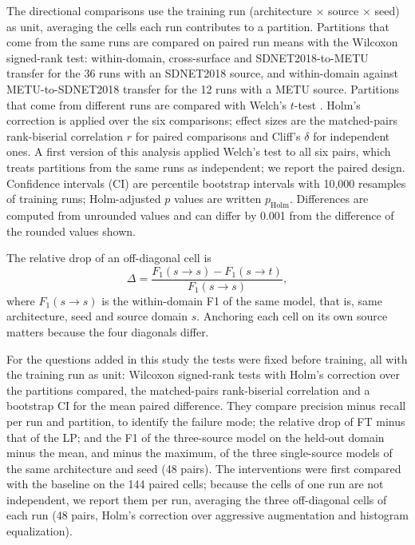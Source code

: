 \documentclass[pdflatex,sn-apa]{sn-jnl}
\begin{document}
The directional comparisons use the training run (architecture $\times$ source $\times$ seed) as unit, averaging the cells each run contributes to a partition. Partitions that come from the same runs are compared on paired run means with the Wilcoxon signed-rank test: within-domain, cross-surface and SDNET2018-to-METU transfer for the 36 runs with an SDNET2018 source, and within-domain against METU-to-SDNET2018 transfer for the 12 runs with a METU source. Partitions that come from different runs are compared with Welch's $t$-test \citep{welch1947}. Holm's correction \citep{holm1979} is applied over the six comparisons; effect sizes are the matched-pairs rank-biserial correlation $r$ for paired comparisons and Cliff's $\delta$ \citep{cliff1993} for independent ones. A first version of this analysis applied Welch's test to all six pairs, which treats partitions from the same runs as independent; we report the paired design. Confidence intervals (CI) are percentile bootstrap intervals with 10,000 resamples of training runs; Holm-adjusted $p$ values are written $p_\mathrm{Holm}$. Differences are computed from unrounded values and can differ by 0.001 from the difference of the rounded values shown.

The relative drop of an off-diagonal cell is
\begin{equation}
\Delta = \frac{F_1(s \to s) - F_1(s \to t)}{F_1(s \to s)},\label{eq:drop}
\end{equation}
where $F_1(s\to s)$ is the within-domain F1 of the same model, that is, same architecture, seed and source domain $s$. Anchoring each cell on its own source matters because the four diagonals differ.

For the questions added in this study the tests were fixed before training, all with the training run as unit: Wilcoxon signed-rank tests with Holm's correction over the partitions compared, the matched-pairs rank-biserial correlation and a bootstrap CI for the mean paired difference. They compare precision minus recall per run and partition, to identify the failure mode; the relative drop of FT minus that of the LP; and the F1 of the three-source model on the held-out domain minus the mean, and minus the maximum, of the three single-source models of the same architecture and seed (48 pairs). The interventions were first compared with the baseline on the 144 paired cells; because the cells of one run are not independent, we report them per run, averaging the three off-diagonal cells of each run (48 pairs, Holm's correction over aggressive augmentation and histogram equalization).
\end{document}
